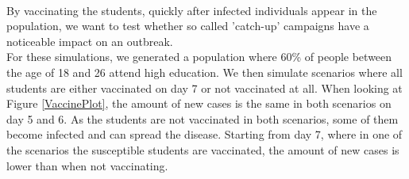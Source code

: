 \documentclass[runningheads]{llncs}
\begin{document}
\paragraph{} By vaccinating the students, quickly after infected individuals appear in the population, we want to test whether so called 'catch-up' campaigns have a noticeable impact on an outbreak. \\
For these simulations, we generated a population where 60\% of people between the age of 18 and 26 attend high education. We then simulate scenarios where all students are either vaccinated on day 7 or not vaccinated at all. When looking at Figure \ref{VaccinePlot}, the amount of new cases is the same in both scenarios on day 5 and 6. As the students are not vaccinated in both scenarios, some of them become infected and can spread the disease. Starting from day 7, where in one of the scenarios the susceptible students are vaccinated, the amount of new cases is lower than when not vaccinating.
\end{document}
